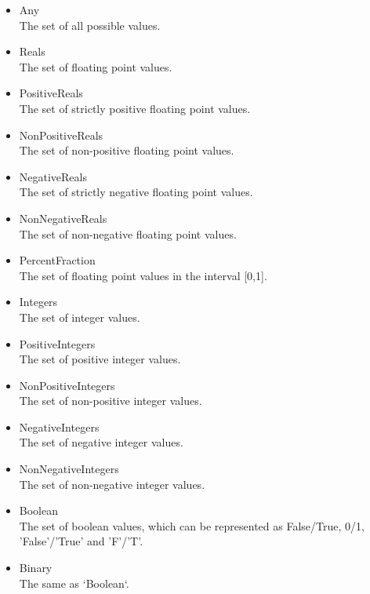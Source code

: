 \begin{itemize}

\item Any\\
    The set of all possible values.

\item Reals\\
    The set of floating point values.

\item PositiveReals\\
    The set of strictly positive floating point values.

\item NonPositiveReals\\
    The set of non-positive floating point values.

\item NegativeReals\\
    The set of strictly negative floating point values.

\item NonNegativeReals\\
    The set of non-negative floating point values.

\item PercentFraction\\
    The set of floating point values in the interval [0,1].

\item Integers\\
    The set of integer values.

\item PositiveIntegers\\
    The set of positive integer values.

\item NonPositiveIntegers\\
    The set of non-positive integer values.

\item NegativeIntegers\\
    The set of negative integer values.

\item NonNegativeIntegers\\
    The set of non-negative integer values.

\item Boolean\\
    The set of boolean values, which can be represented as False/True, 0/1, 'False'/'True' and 'F'/'T'.

\item Binary\\
    The same as `Boolean`.
\end{itemize}


